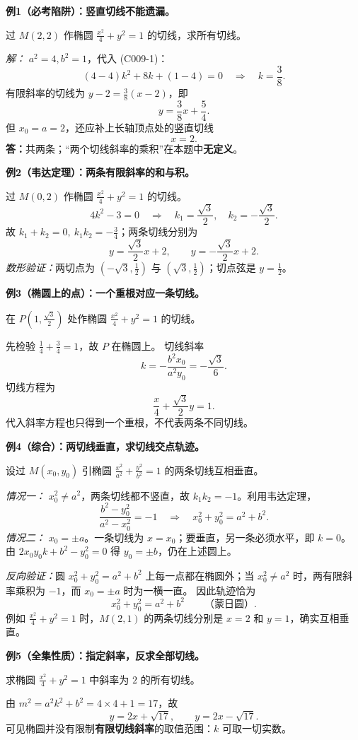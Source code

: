 \begin{examplebox}
\textbf{例1（必考陷阱）：竖直切线不能遗漏。}

过 $M(2,2)$ 作椭圆 $\frac{x^2}{4}+y^2=1$ 的切线，求所有切线。

\textit{解：} $a^2=4,b^2=1$，代入 (C009-1)：
\[
(4-4)k^2+8k+(1-4)=0\quad\Longrightarrow\quad k=\frac38.
\]
有限斜率的切线为 $y-2=\frac38(x-2)$，即
\[
\boxed{y=\frac38x+\frac54}.
\]
但 $x_0=a=2$，还应补上长轴顶点处的竖直切线
\[
\boxed{x=2}.
\]
\textbf{答：}共两条；“两个切线斜率的乘积”在本题中\textbf{无定义}。

\medskip
\textbf{例2（韦达定理）：两条有限斜率的和与积。}

过 $M(0,2)$ 作椭圆 $\frac{x^2}{4}+y^2=1$ 的切线。
\[
4k^2-3=0\quad\Longrightarrow\quad
\boxed{k_1=\frac{\sqrt3}{2},\quad k_2=-\frac{\sqrt3}{2}}.
\]
故 $k_1+k_2=0,\ k_1k_2=-\frac34$；两条切线分别为
\[
\boxed{y=\frac{\sqrt3}{2}x+2,\qquad y=-\frac{\sqrt3}{2}x+2}.
\]
\textit{数形验证：}两切点为 $(-\sqrt3,\frac12)$ 与 $(\sqrt3,\frac12)$；切点弦是 $y=\frac12$。

\medskip
\textbf{例3（椭圆上的点）：一个重根对应一条切线。}

在 $P(1,\frac{\sqrt3}{2})$ 处作椭圆 $\frac{x^2}{4}+y^2=1$ 的切线。

先检验 $\frac14+\frac34=1$，故 $P$ 在椭圆上。
切线斜率
\[
\boxed{k=-\frac{b^2x_0}{a^2y_0}=-\frac{\sqrt3}{6}}.
\]
切线方程为
\[
\boxed{\frac{x}{4}+\frac{\sqrt3}{2}y=1}.
\]
代入斜率方程也只得到一个重根，不代表两条不同切线。

\medskip
\textbf{例4（综合）：两切线垂直，求切线交点轨迹。}

设过 $M(x_0,y_0)$ 引椭圆 $\frac{x^2}{a^2}+\frac{y^2}{b^2}=1$ 的两条切线互相垂直。

\textit{情况一：} $x_0^2\ne a^2$，两条切线都不竖直，故 $k_1k_2=-1$。利用韦达定理，
\[
\frac{b^2-y_0^2}{a^2-x_0^2}=-1
\quad\Longrightarrow\quad\boxed{x_0^2+y_0^2=a^2+b^2}.
\]
\textit{情况二：} $x_0=\pm a$。一条切线为 $x=x_0$；要垂直，另一条必须水平，即 $k=0$。
由 $2x_0y_0k+b^2-y_0^2=0$ 得 $y_0=\pm b$，仍在上述圆上。

\textit{反向验证：}圆 $x_0^2+y_0^2=a^2+b^2$ 上每一点都在椭圆外；当 $x_0^2\ne a^2$ 时，两有限斜率乘积为 $-1$，而 $x_0=\pm a$ 时为一横一直。
因此轨迹恰为
\[
\boxed{x_0^2+y_0^2=a^2+b^2}\qquad\text{（蒙日圆）}.
\]
例如 $\frac{x^2}{4}+y^2=1$ 时，$M(2,1)$ 的两条切线分别是 $x=2$ 和 $y=1$，确实互相垂直。

\medskip
\textbf{例5（全集性质）：指定斜率，反求全部切线。}

求椭圆 $\frac{x^2}{4}+y^2=1$ 中斜率为 $2$ 的所有切线。

由 $m^2=a^2k^2+b^2=4\times 4+1=17$，故
\[
\boxed{y=2x+\sqrt{17},\qquad y=2x-\sqrt{17}}.
\]
可见椭圆并没有限制\textbf{有限切线斜率}的取值范围：$k$ 可取一切实数。
\end{examplebox}
